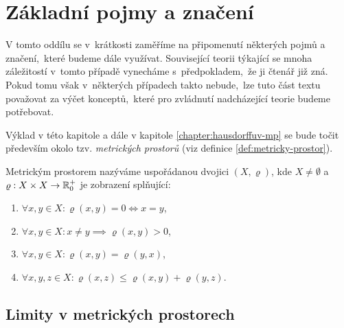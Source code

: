 \section{Základní pojmy a značení}\label{sec:zakladni-pojmy-a-znaceni}

V tomto oddílu se v~krátkosti zaměříme na připomenutí některých pojmů a značení,~které budeme dále využívat. Související teorii týkající se mnoha záležitostí v~tomto případě vynecháme s~předpokladem,~že ji čtenář již zná. Pokud tomu však v~některých případech takto nebude,~lze tuto část textu považovat za výčet konceptů,~které pro zvládnutí nadcházející teorie budeme potřebovat.

Výklad v této kapitole a dále v kapitole \ref{chapter:hausdorffuv-mp} se bude točit především okolo tzv. \emph{metrických prostorů} (viz definice \ref{def:metricky-prostor}).
\begin{definition}\label{def:metricky-prostor}
    Metrickým prostorem nazýváme uspořádanou dvojici $(X,\varrho)$, kde $X\neq\emptyset$ a $\varrho:X\times X \rightarrow \mathbb{R}_0^+$ je zobrazení splňující:
    \begin{enumerate}[label=(\alph*)]
        \item $\forall x,y\in X: \varrho(x,y)=0\iff x=y$,
        \item $\forall x,y\in X: x\neq y\implies \varrho(x,y)>0$,
        \item $\forall x,y\in X: \varrho(x,y)=\varrho(y,x)$,
        \item $\forall x,y,z\in X: \varrho(x,z)\leqslant\varrho(x,y)+\varrho(y,z)$.
    \end{enumerate}
\end{definition}

\subsection{Limity v metrických prostorech}\label{subsec:limity-v-mp}

